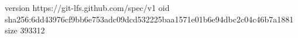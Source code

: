 version https://git-lfs.github.com/spec/v1
oid sha256:6dd43976cf9bb6e753adc09dcd532225baa1571e01b6e94dbc2c04c46b7a1881
size 393312
